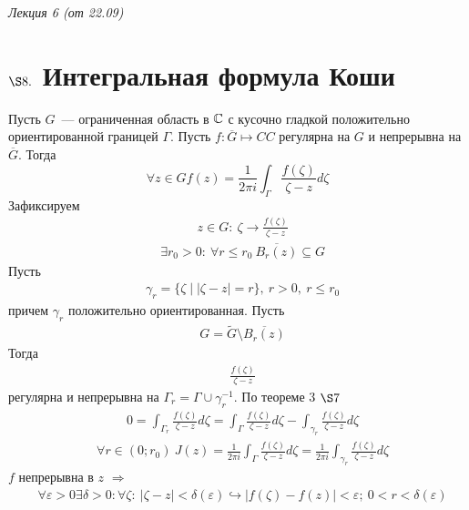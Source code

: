 \begin{flushright}
    \textit{Лекция 6 (от 22.09)}
\end{flushright}
\section{$\S 8.$ Интегральная формула Коши}
\theorem
Пусть $G$~--- ограниченная область в $\mathbb{C}$ с кусочно гладкой положительно
ориентированной границей $\Gamma$. Пусть $f: \overline{G} \mapsto CC$ регулярна
на $G$ и непрерывна на $\overline{G}$. Тогда
\begin{equation} \label{(8.1)}
    \forall z \in G f(z) = \frac{1}{2\pi i}\int_{\Gamma}\frac{f(\zeta)}{\zeta - z}d\zeta
\end{equation}
\pr
Зафиксируем
\begin{align*}
  & z \in G: \ \zeta \to \frac{f(\zeta)}{\zeta - z}
\end{align*}
\begin{align*}
  & \exists r_0 > 0: \ \forall r \leq r_0 \ \overline{B_r(z)} \subseteq G
\end{align*}
Пусть
\begin{align*}
  & \gamma_r = \{\zeta \mid \left| \zeta - z \right| = r\}, \ r > 0, \ r \leq r_0
\end{align*}
причем $\gamma_r$ положительно ориентированная. Пусть
\begin{align*}
  & G = \tilde{G} \setminus \overline{B_r(z)}
\end{align*}
Тогда
\begin{align*}
  & \frac{f(\zeta)}{\zeta - z}
\end{align*}
регулярна и непрерывна на $\Gamma_r = \Gamma \cup \gamma_r^{-1}$.
По теореме $3$ $\S 7$
\begin{align*}
  & 0 = \int_{\Gamma_r} \frac{f(\zeta)}{\zeta - z} d \zeta =  \int_{\Gamma} \frac{f(\zeta)}{\zeta - z} d \zeta - \int_{\gamma_r} \frac{f(\zeta)}{\zeta - z} d \zeta
\end{align*}
\begin{align*}
  & \forall r \in (0; r_0) \ J(z) = \frac{1}{2 \pi i} \int_{\Gamma} \frac{f(\zeta)}{\zeta - z} d \zeta = \frac{1}{2 \pi i} \int_{\gamma_r} \frac{f(\zeta)}{\zeta - z} d \zeta
\end{align*}
$f$ непрерывна в $z$ $\Rightarrow$
\begin{align*}
  & \forall \varepsilon > 0 \exists \delta > 0: \forall \zeta: \ \left| \zeta - z \right| < \delta(\varepsilon) \hookrightarrow \left| f(\zeta) - f(z) \right| < \varepsilon; \ 0 < r < \delta(\varepsilon)
\end{align*}
